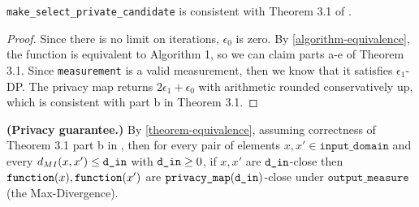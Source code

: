 \documentclass{article}
\begin{document}
\begin{theorem}
    \label{theorem-equivalence}
    \texttt{make\_select\_private\_candidate} is consistent with Theorem 3.1 of \cite{liu2018privateselectionprivatecandidates}.
\end{theorem}

\begin{proof}
    Since there is no limit on iterations, $\epsilon_0$ is zero.
    By \ref{algorithm-equivalence}, the function is equivalent to Algorithm 1, so we can claim parts a-e of Theorem 3.1.
    Since \texttt{measurement} is a valid measurement, then we know that it satisfies $\epsilon_1$-DP.
    The privacy map returns $2\epsilon_1 + \epsilon_0$ with arithmetic rounded conservatively up,
    which is consistent with part b in Theorem 3.1.
\end{proof}

\textbf{(Privacy guarantee.)} 
By \ref{theorem-equivalence}, assuming correctness of Theorem 3.1 part b in \cite{liu2018privateselectionprivatecandidates},
then for every pair of elements $x, x' \in \texttt{input\_domain}$ and every $d_{MI}(x, x') \le \texttt{d\_in}$ with $\texttt{d\_in} \ge 0$, 
if $x, x'$ are $\texttt{d\_in}$-close then $\texttt{function}(x), \texttt{function}(x')$ are $\texttt{privacy\_map}(\texttt{d\_in})$-close under $\texttt{output\_measure}$ (the Max-Divergence).



\end{document}
